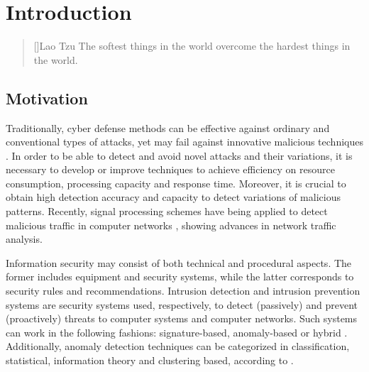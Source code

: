\chapter{Introduction}
\label{ch:1_introduction}

\begin{quotation}[]{Lao Tzu}
The softest things in the world overcome the hardest things in the world.
\end{quotation}


\section{Motivation}
\label{sc:motivation}

Traditionally, cyber defense methods can be effective against ordinary and conventional types of attacks, yet may fail against innovative malicious techniques \cite{lakhina2005mining}. In order to be able to detect and avoid novel attacks and their variations, it is necessary to develop or improve techniques to achieve efficiency on resource consumption, processing capacity and response time. Moreover, it is crucial to obtain high detection accuracy and capacity to detect variations of malicious patterns. Recently, signal processing schemes have being applied to detect malicious traffic in computer networks \cite{Lu2009,Huang2009,Zonglin2009,david2011blind,da2012improved,tenorio2013greatest, vieira2017model}, showing advances in network traffic analysis.

Information security may consist of both technical and procedural aspects. The former includes equipment and security systems, while the latter corresponds to security rules and recommendations. Intrusion detection and intrusion prevention systems are security systems used, respectively, to detect (passively) and prevent (proactively) threats to computer systems and computer networks. Such systems can work in the following fashions: signature-based, anomaly-based or hybrid \cite{Huang2009,mudzingwa2012study}. Additionally, anomaly detection techniques can be categorized in classification, statistical, information theory and clustering based, according to \cite{bhuyan2014network,ahmed2016survey,osanaiye2016distributed}.

